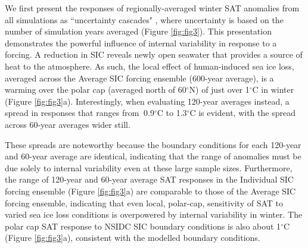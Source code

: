 \documentclass{nature}
\begin{document}
We first present the responses of regionally-averaged winter SAT anomalies from all simulations as ``uncertainty cascades" \cite{wilby10,swart15}, where uncertainty is based on the number of simulation years averaged (Figure \ref{fig:fig3}). This presentation demonstrates the powerful influence of internal variability in response to a forcing. A reduction in SIC reveals newly open seawater that provides a source of heat to the atmosphere. As such, the local effect of human-induced sea ice loss, averaged across the Average SIC forcing ensemble (600-year average), is a warming over the polar cap (averaged north of 60$^\circ$N) of just over 1$^\circ$C in winter (Figure \ref{fig:fig3}a). Interestingly, when evaluating 120-year averages instead, a spread in responses that ranges from $~$0.9$^\circ$C to 1.3$^\circ$C is evident, with the spread across 60-year averages wider still. 

These spreads are noteworthy because the boundary conditions for each 120-year and 60-year average are identical, indicating that the range of anomalies must be due solely to internal variability even at these large sample sizes. Furthermore, the range of 120-year and 60-year average SAT responses in the Individual SIC forcing ensemble (Figure \ref{fig:fig3}a) are comparable to those of the Average SIC forcing ensemble, indicating that even local, polar-cap, sensitivity of SAT to varied sea ice loss conditions is overpowered by internal variability in winter. The polar cap SAT response to NSIDC SIC boundary conditions is also about 1$^\circ$C (Figure \ref{fig:fig3}a), consistent with the modelled boundary conditions.   %

\end{document}
